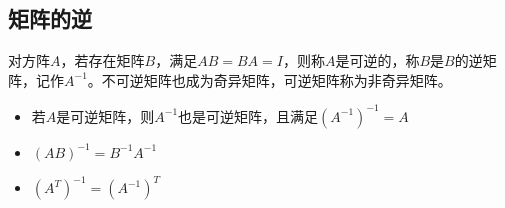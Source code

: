 \subsection{矩阵的逆}
对方阵$ A $，若存在矩阵$ B $，满足$AB=BA=I$，则称$ A $是可逆的，称$ B $是$ B $的逆矩阵，记作$A^{-1}$。不可逆矩阵也成为奇异矩阵，可逆矩阵称为非奇异矩阵。
\begin{itemize}
	\item 若$ A $是可逆矩阵，则$ A^{-1} $也是可逆矩阵，且满足$ (A^{-1})^{-1}=A $
	\item $ (AB)^{-1}=B^{-1}A^{-1} $
	\item $ (A^T)^{-1}=(A^{-1})^T $
\end{itemize}


















